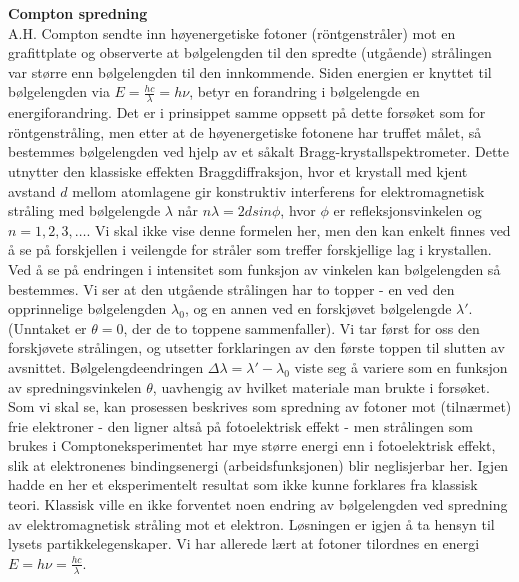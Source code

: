 \documentclass[8pt, A4paper, norsk]{extarticle}
\begin{document}
\begin{multicols*}{3}
\centering \textbf{Compton spredning} \\
A.H. Compton sendte inn høyenergetiske fotoner (röntgenstråler) mot en grafittplate og observerte at bølgelengden til den spredte (utgående) strålingen var større enn bølgelengden til den innkommende. Siden energien er knyttet til bølgelengden via $E = \frac{hc}{\lambda} = h \nu$, betyr en forandring i bølgelengde en energiforandring. Det er i prinsippet samme oppsett på dette forsøket som for röntgenstråling, men etter at de høyenergetiske fotonene har truffet målet, så bestemmes bølgelengden ved hjelp av et såkalt Bragg-krystallspektrometer. Dette utnytter den klassiske effekten Braggdiffraksjon, hvor et krystall med kjent avstand $d$ mellom atomlagene gir konstruktiv interferens for elektromagnetisk stråling med bølgelengde $\lambda$ når $n \lambda = 2d sin \phi$, hvor $\phi$ er refleksjonsvinkelen og $n = 1, 2, 3, \dots$. Vi skal ikke vise denne formelen her, men den kan enkelt finnes ved å se på forskjellen i veilengde for stråler som treffer forskjellige lag i krystallen. Ved å se på endringen i intensitet som funksjon av vinkelen kan
bølgelengden så bestemmes. Vi ser at den utgående strålingen har to topper - en ved den opprinnelige bølgelengden $\lambda_0$, og en annen ved en forskjøvet bølgelengde $\lambda'$. (Unntaket er $\theta = 0$, der de to toppene sammenfaller). Vi tar først for oss den forskjøvete strålingen, og utsetter forklaringen av den første toppen til slutten av avsnittet. Bølgelengdeendringen
$\Delta \lambda = \lambda' - \lambda_0$ viste seg å variere som en funksjon av spredningsvinkelen $\theta$, uavhengig av hvilket materiale man brukte i forsøket. Som vi skal se, kan prosessen beskrives som spredning av fotoner mot (tilnærmet) frie elektroner - den ligner altså på fotoelektrisk effekt - men strålingen som brukes i Comptoneksperimentet har mye større energi enn i fotoelektrisk effekt, slik at elektronenes bindingsenergi (arbeidsfunksjonen) blir neglisjerbar her. Igjen hadde en her et eksperimentelt resultat som ikke kunne forklares fra klassisk teori. Klassisk ville en ikke forventet noen endring av bølgelengden ved spredning av elektromagnetisk stråling mot et elektron. Løsningen er igjen å ta hensyn til lysets partikkelegenskaper. Vi har allerede lært at fotoner tilordnes en energi $E = h \nu = \frac{hc}{\lambda}$.

\vspace{2mm}


\end{multicols*}
\end{document}
